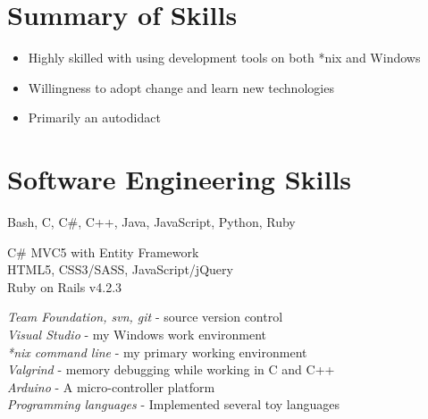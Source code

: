 \documentclass[10pt]{article} %
\begin{document}

\vspace{-4mm}
\section{Summary of Skills}
\vspace{-3mm}

\begin{itemize}
\item Highly skilled with using development tools on both *nix and Windows
\vspace{-3mm}
\item Willingness to adopt change and learn new technologies
\vspace{-3mm}
\item Primarily an autodidact
\vspace{-3mm}
\end{itemize}

\section{Software Engineering Skills}
\vspace{-3mm}

{
  Bash, C, C\#, C++, Java, JavaScript, Python, Ruby
}


{
  C\# MVC5 with Entity Framework \\
  HTML5, CSS3/SASS, JavaScript/jQuery \\
  Ruby on Rails v4.2.3
}


{
\textit{Team Foundation, svn, git} - source version control \\
\textit{Visual Studio} - my Windows work environment \\
\textit{*nix command line} - my primary working environment \\
\textit{Valgrind} - memory debugging while working in C and C++ \\
\textit{Arduino} - A micro-controller platform \\
\textit{Programming languages} - Implemented several toy languages
}
\end{document}
